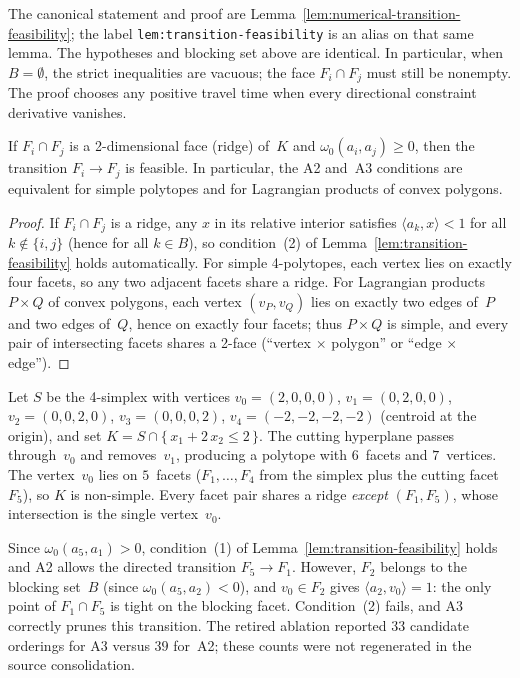 The canonical statement and proof are
Lemma~\ref{lem:numerical-transition-feasibility}; the label
\texttt{lem:transition-feasibility} is an alias on that same lemma.
The hypotheses and blocking set above are identical.  In particular, when
$B=\emptyset$, the strict inequalities are vacuous; the face
$F_i\cap F_j$ must still be nonempty.  The proof chooses any positive
travel time when every directional constraint derivative vanishes.


\begin{unverified}
\begin{corollary}
\label{cor:ridge-sufficiency}
If\/ $F_i \cap F_j$ is a 2-dimensional face (ridge) of~$K$
and $\omega_0(a_i, a_j) \ge 0$, then the transition $F_i \to F_j$
is feasible.
In particular, the A2 and~A3 conditions are equivalent
for simple polytopes and for Lagrangian products of convex polygons.
\end{corollary}

\begin{proof}
If $F_i \cap F_j$ is a ridge, any $x$ in its relative interior satisfies
$\langle a_k, x \rangle < 1$ for all $k \notin \{i,j\}$ (hence for all $k \in B$),
so condition~(2) of Lemma~\ref{lem:transition-feasibility} holds
automatically.
For simple 4-polytopes, each vertex lies on exactly four facets,
so any two adjacent facets share a ridge.
For Lagrangian products $P \times Q$ of convex polygons,
each vertex $(v_P, v_Q)$ lies on exactly two edges of~$P$
and two edges of~$Q$, hence on exactly four facets;
thus $P \times Q$ is simple, and every pair of intersecting facets
shares a 2-face (``vertex $\times$ polygon'' or ``edge $\times$ edge'').
\end{proof}
\end{unverified}

\begin{example}
\label{ex:a3-prunes}
Let $S$ be the 4-simplex with vertices
$v_0 = (2,0,0,0)$,\; $v_1 = (0,2,0,0)$,\; $v_2 = (0,0,2,0)$,\;
$v_3 = (0,0,0,2)$,\; $v_4 = (-2,-2,-2,-2)$
(centroid at the origin), and set
$K = S \cap \{\, x_1 + 2\, x_2 \le 2 \,\}$.
The cutting hyperplane passes through~$v_0$ and removes~$v_1$,
producing a polytope with $6$~facets and $7$~vertices.
The vertex~$v_0$ lies on $5$~facets ($F_1,\ldots,F_4$ from the simplex
plus the cutting facet~$F_5$), so $K$ is non-simple.
Every facet pair shares a ridge \emph{except} $(F_1, F_5)$,
whose intersection is the single vertex~$v_0$.

Since $\omega_0(a_5, a_1) > 0$, condition~(1) of
Lemma~\ref{lem:transition-feasibility} holds and A2 allows
the directed transition $F_5 \to F_1$.
However, $F_2$ belongs to the blocking set~$B$
(since $\omega_0(a_5, a_2) < 0$), and $v_0 \in F_2$
gives $\langle a_2, v_0 \rangle = 1$:
the only point of $F_1 \cap F_5$ is tight on the blocking facet.
Condition~(2) fails, and A3 correctly prunes this transition.
The retired ablation reported $33$ candidate orderings for A3 versus $39$
for~A2; these counts were not regenerated in the source consolidation.
\end{example}
